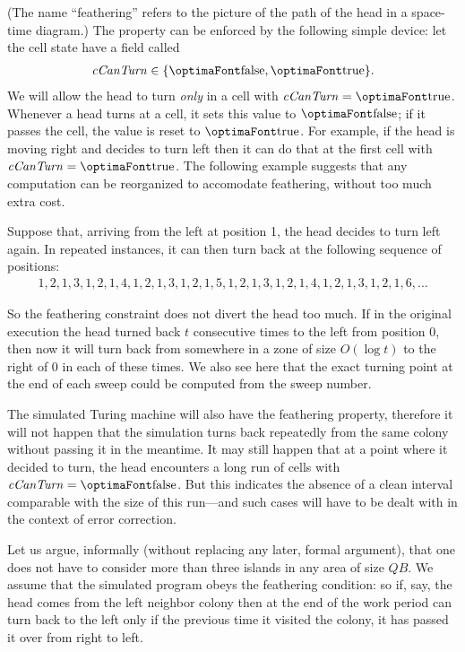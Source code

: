 \documentclass[12pt]{memoir}
\newcommand{\fld}[1]{\ensuremath{\textit{#1\/}}}
\def\B{B}
\newcommand{\Q}{Q}
\newcommand{\cCanTurn}{\fld{cCanTurn}}
\begin{document}
(The name ``feathering'' refers to the picture of the path of the head in a space-time diagram.)
The property can be enforced by the following simple
device: let the cell state have a field called
\begin{align*}
   \cCanTurn\in\{ \false,\true \}.
 \end{align*}
We will allow the head to turn \emph{only} in a cell with \( \cCanTurn=\true \).
Whenever a head turns at a cell, it sets this value to \( \false \); if  it passes the cell, the value 
is reset to \( \true \).
For example, if the head is moving right and decides to turn left then
it can do that at the first cell with \( \cCanTurn=\true \).
The following example suggests that any computation can be reorganized to accomodate feathering,
without too much extra cost.

\begin{example}[Feathering]\label{xmp:feathering}
Suppose that, arriving from the left at position 1, the head decides to turn left again.
In repeated instances, it can then turn back at the following sequence of positions:
\begin{align*}
 1, 2, 1, 3, 1, 2, 1, 4, 1, 2, 1, 3, 1, 2, 1, 5, 1, 2, 1, 3, 1, 2, 1, 4, 1, 2, 1, 3, 1, 2, 1, 6, \dots
 \end{align*}
\end{example}

So the feathering constraint does not divert the head too much.
If in the original execution the head turned back \( t \) consecutive
times to the left from position 0, then now it will 
turn back from somewhere in a zone of size \( O(\log t) \) to the right of 0 in 
each of these times.
We also see here that the exact turning point at the end of each sweep
could be computed from the sweep number.

The simulated Turing machine will also have the feathering property,
therefore it will not happen that the simulation turns back repeatedly 
from the same colony without passing it in the meantime.
It may still happen that at a point where it decided to turn, 
the head encounters a long run of cells with \( \cCanTurn=\false \).
But this indicates the absence of a clean interval comparable with the size of this 
run---and such cases will have to be dealt with in the context of error correction.

Let us argue, informally (without replacing any later, formal argument), that one does 
not have to consider more than three islands in any area of size \( \Q\B \). 
We assume that the simulated program obeys the
feathering condition: so if, say, the head comes from the left neighbor colony
then at the end of the work period can turn back to the left only if 
the previous time it visited the colony, it has passed it over from right to left.
\end{document}
